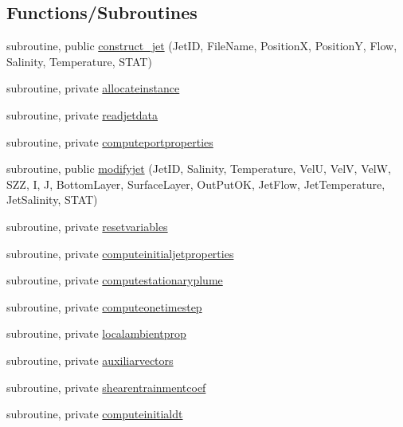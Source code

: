 \subsection*{Functions/\+Subroutines}
\begin{DoxyCompactItemize}
\item 
subroutine, public \mbox{\hyperlink{namespacemodulejet_abc7edc1751a89ee8c640aaea045a3d01}{construct\+\_\+jet}} (Jet\+ID, File\+Name, PositionX, PositionY, Flow, Salinity, Temperature, S\+T\+AT)
\item 
subroutine, private \mbox{\hyperlink{namespacemodulejet_af21d1a641f05197da226314abaeccf5e}{allocateinstance}}
\item 
subroutine, private \mbox{\hyperlink{namespacemodulejet_ad99b3da948112f106201831bbaaa074f}{readjetdata}}
\item 
subroutine, private \mbox{\hyperlink{namespacemodulejet_a6a2424bc396ad0eed996ed0d75430e3b}{computeportproperties}}
\item 
subroutine, public \mbox{\hyperlink{namespacemodulejet_aabae5c457f7fe1dd3d3f540d56e94877}{modifyjet}} (Jet\+ID, Salinity, Temperature, VelU, VelV, VelW, S\+ZZ, I, J, Bottom\+Layer, Surface\+Layer, Out\+Put\+OK, Jet\+Flow, Jet\+Temperature, Jet\+Salinity, S\+T\+AT)
\item 
subroutine, private \mbox{\hyperlink{namespacemodulejet_ab0790a91803700e0bd5e3ef9db5242c1}{resetvariables}}
\item 
subroutine, private \mbox{\hyperlink{namespacemodulejet_a8b1ef801e649c2313fee9754d2aeb58a}{computeinitialjetproperties}}
\item 
subroutine, private \mbox{\hyperlink{namespacemodulejet_aa0e9555f7e9aa809220382ec3e33e9a5}{computestationaryplume}}
\item 
subroutine, private \mbox{\hyperlink{namespacemodulejet_aa7fe235d6b33c696f614897ed43a1e19}{computeonetimestep}}
\item 
subroutine, private \mbox{\hyperlink{namespacemodulejet_a1eea8311f846796ccfa34a65730c5c55}{localambientprop}}
\item 
subroutine, private \mbox{\hyperlink{namespacemodulejet_a188ea99d96436b044d3ea76f4ddfa467}{auxiliarvectors}}
\item 
subroutine, private \mbox{\hyperlink{namespacemodulejet_afbaba1fae7aab0a9a372600923511fed}{shearentrainmentcoef}}
\item 
subroutine, private \mbox{\hyperlink{namespacemodulejet_a0425b9fdbf288a0e893428f44a92b9ea}{computeinitialdt}}
\item 

\end{DoxyCompactItemize}

